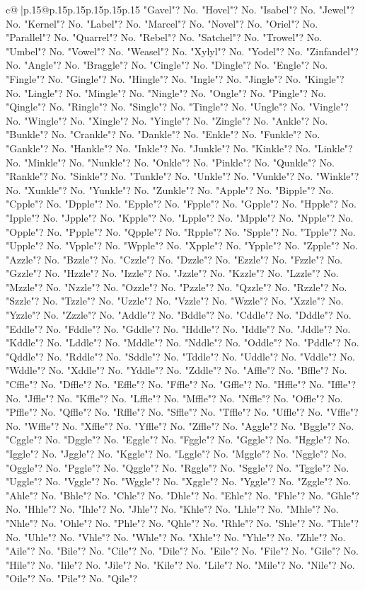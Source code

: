 \documentclass{article}
\begin{document}
{\begin{supertabular}{c@{$\;$}|p{.15\linewidth}@{}p{.15\linewidth}p{.15\linewidth}p{.15\linewidth}p{.15\linewidth}p{.15\linewidth}}
{{{"Gavel"? No. "Hovel"? No. "Isabel"? No. "Jewel"? No. "Kernel"? No. "Label"? No. "Marcel"? No. "Novel"? No. "Oriel"? No. "Parallel"? No. "Quarrel"? No. "Rebel"? No. "Satchel"? No. "Trowel"? No. "Umbel"? No. "Vowel"? No. "Weasel"? No. "Xylyl"? No. "Yodel"? No. "Zinfandel"? No. "Angle"? No. "Braggle"? No. "Cingle"? No. "Dingle"? No. "Engle"? No. "Fingle"? No. "Gingle"? No. "Hingle"? No. "Ingle"? No. "Jingle"? No. "Kingle"? No. "Lingle"? No. "Mingle"? No. "Ningle"? No. "Ongle"? No. "Pingle"? No. "Qingle"? No. "Ringle"? No. "Single"? No. "Tingle"? No. "Ungle"? No. "Vingle"? No. "Wingle"? No. "Xingle"? No. "Yingle"? No. "Zingle"? No. "Ankle"? No. "Bunkle"? No. "Crankle"? No. "Dankle"? No. "Enkle"? No. "Funkle"? No. "Gankle"? No. "Hankle"? No. "Inkle"? No. "Junkle"? No. "Kinkle"? No. "Linkle"? No. "Minkle"? No. "Nunkle"? No. "Onkle"? No. "Pinkle"? No. "Qunkle"? No. "Rankle"? No. "Sinkle"? No. "Tunkle"? No. "Unkle"? No. "Vunkle"? No. "Winkle"? No. "Xunkle"? No. "Yunkle"? No. "Zunkle"? No. "Apple"? No. "Bipple"? No. "Cpple"? No. "Dpple"? No. "Epple"? No. "Fpple"? No. "Gpple"? No. "Hpple"? No. "Ipple"? No. "Jpple"? No. "Kpple"? No. "Lpple"? No. "Mpple"? No. "Npple"? No. "Opple"? No. "Ppple"? No. "Qpple"? No. "Rpple"? No. "Spple"? No. "Tpple"? No. "Upple"? No. "Vpple"? No. "Wpple"? No. "Xpple"? No. "Ypple"? No. "Zpple"? No. "Azzle"? No. "Bzzle"? No. "Czzle"? No. "Dzzle"? No. "Ezzle"? No. "Fzzle"? No. "Gzzle"? No. "Hzzle"? No. "Izzle"? No. "Jzzle"? No. "Kzzle"? No. "Lzzle"? No. "Mzzle"? No. "Nzzle"? No. "Ozzle"? No. "Pzzle"? No. "Qzzle"? No. "Rzzle"? No. "Szzle"? No. "Tzzle"? No. "Uzzle"? No. "Vzzle"? No. "Wzzle"? No. "Xzzle"? No. "Yzzle"? No. "Zzzle"? No. "Addle"? No. "Bddle"? No. "Cddle"? No. "Dddle"? No. "Eddle"? No. "Fddle"? No. "Gddle"? No. "Hddle"? No. "Iddle"? No. "Jddle"? No. "Kddle"? No. "Lddle"? No. "Mddle"? No. "Nddle"? No. "Oddle"? No. "Pddle"? No. "Qddle"? No. "Rddle"? No. "Sddle"? No. "Tddle"? No. "Uddle"? No. "Vddle"? No. "Wddle"? No. "Xddle"? No. "Yddle"? No. "Zddle"? No. "Affle"? No. "Bffle"? No. "Cffle"? No. "Dffle"? No. "Effle"? No. "Fffle"? No. "Gffle"? No. "Hffle"? No. "Iffle"? No. "Jffle"? No. "Kffle"? No. "Lffle"? No. "Mffle"? No. "Nffle"? No. "Offle"? No. "Pffle"? No. "Qffle"? No. "Rffle"? No. "Sffle"? No. "Tffle"? No. "Uffle"? No. "Vffle"? No. "Wffle"? No. "Xffle"? No. "Yffle"? No. "Zffle"? No. "Aggle"? No. "Bggle"? No. "Cggle"? No. "Dggle"? No. "Eggle"? No. "Fggle"? No. "Gggle"? No. "Hggle"? No. "Iggle"? No. "Jggle"? No. "Kggle"? No. "Lggle"? No. "Mggle"? No. "Nggle"? No. "Oggle"? No. "Pggle"? No. "Qggle"? No. "Rggle"? No. "Sggle"? No. "Tggle"? No. "Uggle"? No. "Vggle"? No. "Wggle"? No. "Xggle"? No. "Yggle"? No. "Zggle"? No. "Ahle"? No. "Bhle"? No. "Chle"? No. "Dhle"? No. "Ehle"? No. "Fhle"? No. "Ghle"? No. "Hhle"? No. "Ihle"? No. "Jhle"? No. "Khle"? No. "Lhle"? No. "Mhle"? No. "Nhle"? No. "Ohle"? No. "Phle"? No. "Qhle"? No. "Rhle"? No. "Shle"? No. "Thle"? No. "Uhle"? No. "Vhle"? No. "Whle"? No. "Xhle"? No. "Yhle"? No. "Zhle"? No. "Aile"? No. "Bile"? No. "Cile"? No. "Dile"? No. "Eile"? No. "File"? No. "Gile"? No. "Hile"? No. "Iile"? No. "Jile"? No. "Kile"? No. "Lile"? No. "Mile"? No. "Nile"? No. "Oile"? No. "Pile"? No. "Qile"? }}}
\end{supertabular}}
\end{document}
